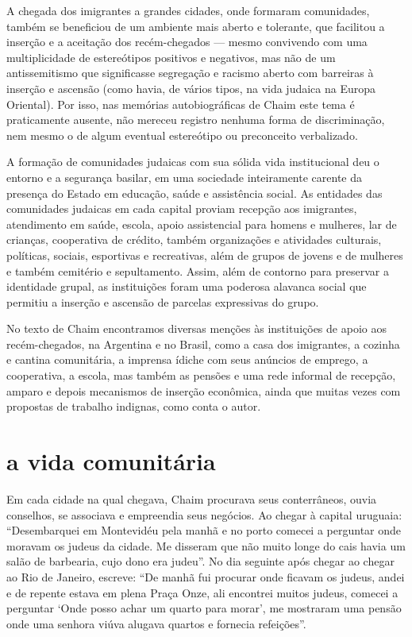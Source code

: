 A chegada dos imigrantes a grandes cidades, onde formaram comunidades,
também se beneficiou de um ambiente mais aberto e tolerante, que
facilitou a inserção e a aceitação dos recém-chegados --- mesmo
convivendo com uma multiplicidade de estereótipos positivos e negativos,
mas não de um antissemitismo que significasse segregação e racismo
aberto com barreiras à inserção e ascensão (como havia, de vários tipos,
na vida judaica na Europa Oriental). Por isso, nas memórias
autobiográficas de Chaim este tema é praticamente ausente, não mereceu
registro nenhuma forma de discriminação, nem mesmo o de algum eventual
estereótipo ou preconceito verbalizado.

A formação de comunidades judaicas com sua sólida vida institucional deu
o entorno e a segurança basilar, em uma sociedade inteiramente carente
da presença do Estado em educação, saúde e assistência social. As
entidades das comunidades judaicas em cada capital proviam recepção aos
imigrantes, atendimento em saúde, escola, apoio assistencial para homens
e mulheres, lar de crianças, cooperativa de crédito, também organizações
e atividades culturais, políticas, sociais, esportivas e recreativas,
além de grupos de jovens e de mulheres e também cemitério e
sepultamento. Assim, além de contorno para preservar a identidade
grupal, as instituições foram uma poderosa alavanca social que permitiu
a inserção e ascensão de parcelas expressivas do grupo.

No texto de Chaim encontramos diversas menções às instituições de apoio
aos recém-chegados, na Argentina e no Brasil, como a casa dos
imigrantes, a cozinha e cantina comunitária, a imprensa ídiche com seus
anúncios de emprego, a cooperativa, a escola, mas também as pensões e
uma rede informal de recepção, amparo e depois mecanismos de inserção
econômica, ainda que muitas vezes com propostas de trabalho indignas,
como conta o autor.

\section{a vida comunitária}

Em cada cidade na qual chegava, Chaim procurava seus conterrâneos, ouvia
conselhos, se associava e empreendia seus negócios. Ao chegar à capital
uruguaia: ``Desembarquei em Montevidéu pela manhã e no porto comecei a
perguntar onde moravam os judeus da cidade. Me disseram que não muito
longe do cais havia um salão de barbearia, cujo dono era judeu''. No dia
seguinte após chegar ao chegar ao Rio de Janeiro, escreve: ``De manhã
fui procurar onde ficavam os judeus, andei e de repente estava em plena
Praça Onze, ali encontrei muitos judeus, comecei a perguntar `Onde posso
achar um quarto para morar', me mostraram uma pensão onde uma senhora
viúva alugava quartos e fornecia refeições''. 

